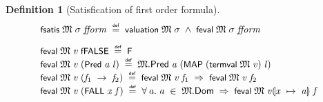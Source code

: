 \documentclass[letterpaper]{article}
\newtheorem{defn}{Definition}
\renewcommand{\HOLConst}[1]{{\textsf{\upshape\small #1}}}
\newenvironment{holmath}{\begin{displaymath}\begin{array}{l}}{\end{array}\end{displaymath}\ignorespacesafterend}
\begin{document}
\begin{defn}[Satisfication of first order formula]
\begin{holmath}
  \HOLConst{fsatis}\;\HOLFreeVar{\ensuremath{\mathfrak{M}}}\;\HOLFreeVar{\ensuremath{\sigma}}\;\HOLFreeVar{fform}\;\HOLSymConst{\HOLTokenDefEquality{}}\;\HOLConst{valuation}\;\HOLFreeVar{\ensuremath{\mathfrak{M}}}\;\HOLFreeVar{\ensuremath{\sigma}}\;\HOLSymConst{\HOLTokenConj{}}\;\HOLConst{feval}\;\HOLFreeVar{\ensuremath{\mathfrak{M}}}\;\HOLFreeVar{\ensuremath{\sigma}}\;\HOLFreeVar{fform}\\[3mm]
  \HOLConst{feval}\;\HOLFreeVar{\ensuremath{\mathfrak{M}}}\;\HOLFreeVar{v}\;\HOLConst{fFALSE}\;\HOLSymConst{\HOLTokenDefEquality{}}\;\HOLConst{F}\\
\HOLConst{feval}\;\HOLFreeVar{\ensuremath{\mathfrak{M}}}\;\HOLFreeVar{v}\;(\HOLConst{Pred}\;\HOLFreeVar{a}\;\HOLFreeVar{l})\;\HOLSymConst{\HOLTokenDefEquality{}}\;\HOLFreeVar{\ensuremath{\mathfrak{M}}}.\HOLFieldName{Pred}\;\HOLFreeVar{a}\;(\HOLConst{MAP}\;(\HOLConst{termval}\;\HOLFreeVar{\ensuremath{\mathfrak{M}}}\;\HOLFreeVar{v})\;\HOLFreeVar{l})\\
\HOLConst{feval}\;\HOLFreeVar{\ensuremath{\mathfrak{M}}}\;\HOLFreeVar{v}\;(\HOLFreeVar{f\sb{\mathrm{1}}}\;\HOLSymConst{\ensuremath{\rightarrow}}\;\HOLFreeVar{f\sb{\mathrm{2}}})\;\HOLSymConst{\HOLTokenDefEquality{}}\;\HOLConst{feval}\;\HOLFreeVar{\ensuremath{\mathfrak{M}}}\;\HOLFreeVar{v}\;\HOLFreeVar{f\sb{\mathrm{1}}}\;\HOLSymConst{\HOLTokenImp{}}\;\HOLConst{feval}\;\HOLFreeVar{\ensuremath{\mathfrak{M}}}\;\HOLFreeVar{v}\;\HOLFreeVar{f\sb{\mathrm{2}}}\\
\HOLConst{feval}\;\HOLFreeVar{\ensuremath{\mathfrak{M}}}\;\HOLFreeVar{v}\;(\HOLConst{FALL}\;\HOLFreeVar{x}\;\HOLFreeVar{f})\;\HOLSymConst{\HOLTokenDefEquality{}}\;\HOLSymConst{\HOLTokenForall{}}\HOLBoundVar{a}.\;\HOLBoundVar{a}\;\HOLSymConst{\HOLTokenIn{}}\;\HOLFreeVar{\ensuremath{\mathfrak{M}}}.\HOLFieldName{Dom}\;\HOLSymConst{\HOLTokenImp{}}\;\HOLConst{feval}\;\HOLFreeVar{\ensuremath{\mathfrak{M}}}\;\HOLFreeVar{v}\ensuremath{\llparenthesis}\HOLFreeVar{x}\;\ensuremath{\mapsto}\;\HOLBoundVar{a}\ensuremath{\rrparenthesis}\;\HOLFreeVar{f}\\
\end{holmath}
\end{defn}
\end{document}

